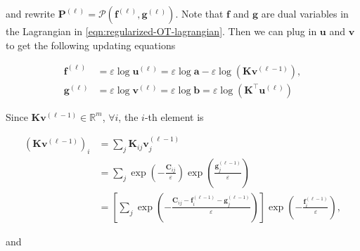 and rewrite $\mathbf{P}^{(\ell)} = \mathcal{P}\left(\mathbf{f}^{(\ell)}, \mathbf{g}^{(\ell)}\right)$.
Note that $\mathbf{f}$ and $\mathbf{g}$ are dual variables in the Lagrangian in \cref{eqn:regularized-OT-lagrangian}.
Then we can plug in $\mathbf{u}$ and $\mathbf{v}$ to get the following updating equations

\begin{equation}\label{eqn:log-sinkhorn-update1}
  \begin{aligned}
    \mathbf{f}^{(\ell)}
     & = \varepsilon\log \mathbf{u}^{(\ell)}
    = \varepsilon\log \mathbf{a} - \varepsilon\log (\mathbf{K} \mathbf{v}^{(\ell-1)}), \\
    \mathbf{g}^{(\ell)}
     & = \varepsilon\log \mathbf{v}^{(\ell)}
    = \varepsilon\log \mathbf{b} = \varepsilon\log (\mathbf{K}^\top \mathbf{u}^{(\ell)})
  \end{aligned}
\end{equation}

Since $\mathbf{K}\mathbf{v}^{(\ell-1)} \in \mathbb{R}^m$, $\forall i$,
the $i$-th element is %

\begin{equation*}
  \begin{aligned}
    \left(\mathbf{K}\mathbf{v}^{(\ell-1)}\right)_i
     & = \sum_j \mathbf{K}_{ij} \mathbf{v}_j^{(\ell-1)}                                                                      \\
     & = \sum_j \exp(-\frac{\mathbf{C}_{ij}}{\varepsilon}) \exp(\frac{\mathbf{g}_j^{(\ell-1)}}{\varepsilon})                 \\
     & = \left[\sum_j \exp(- \frac{\mathbf{C}_{ij} - \mathbf{f}_i^{(\ell-1)} - \mathbf{g}_j^{(\ell-1)}}{\varepsilon})\right]
    \exp(-\frac{\mathbf{f}_i^{(\ell-1)}}{\varepsilon}),
  \end{aligned}
\end{equation*}

and


